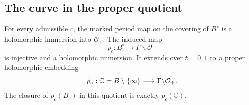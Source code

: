 \subsection{The curve in the proper quotient}\hypertarget{tag-01PY}{}\label{fam:section:F.3}

\begin{theorem}\hypertarget{tag-01RE}{}\label{fam:src:F.3.1}\label{fam:st:F.3.1}

For every admissible $c$, the marked period map on the covering of
$B^\circ$ is a holomorphic immersion into $\mathcal O_+$.  The induced
map
\[
 p_c:B^\circ\longrightarrow\Gamma\backslash\mathcal O_+
\]
is injective and a holomorphic immersion.  It extends over $t=0,1$ to a
proper holomorphic embedding
\[
 \bar p_c:\mathbb C=B\setminus\{\infty\}
 \lhook\joinrel\longrightarrow\Gamma\backslash\mathcal O_+.
\]
The closure of $p_c(B^\circ)$ in this quotient is exactly
$\bar p_c(\mathbb C)$.
\end{theorem}



